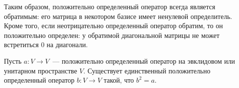 \begin{remark}\label{rem:positive_invertible}
Таким образом, положительно определенный оператор всегда является
обратимым: его матрица в некотором базисе имеет
ненулевой определитель. Кроме того, если неотрицательно определенный
оператор обратим, то он положительно определен: у обратимой
диагональной матрицы не может встретиться $0$ на диагонали.
\end{remark}

\begin{theorem}\label{thm:square_root_positive}
Пусть $a\colon V\to V$~--- положительно определенный
оператор на эвклидовом или унитарном пространстве $V$. Существует
единственный положительно определенный оператор
$b\colon V\to V$ такой, что $b^2 = a$.
\end{theorem}

